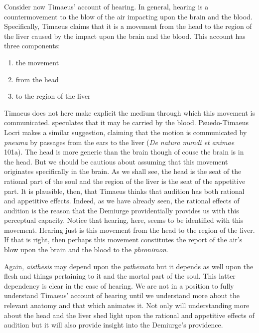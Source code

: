 Consider now Timaeus' account of hearing. In general, hearing is a countermovement to the blow of the air impacting upon the brain and the blood. Specifically, Timaeus claims that it is a movement from the head to the region of the liver caused by the impact upon the brain and the blood. This account has three components:
\begin{enumerate}
	\item the movement
	\item from the head
	\item to the region of the liver
\end{enumerate}
Timaeus does not here make explicit the medium through which this movement is communicated. \citealt[477]{Taylor:1928qb} speculates that it may be carried by the blood. Psuedo-Timaeus Locri makes a similar suggestion, claiming that the motion is communicated by \emph{pneuma} by passages from the ears to the liver (\emph{De natura mundi et animae} 101a). The head is more generic than the brain though of couse the brain is in the head. But we should be cautious about assuming that this movement originates specifically in the brain. As we shall see, the head is the seat of the rational part of the soul and the region of the liver is the seat of the appetitive part. It is plausible, then, that Timaeus thinks that audition has both rational and appetitive effects. Indeed, as we have already seen, the rational effects of audition is the reason that the Demiurge providentially provides us with this perceptual capacity. Notice that hearing, here, seems to be identified with this movement. Hearing just is this movement from the head to the region of the liver. If that is right, then perhaps this movement constitutes the report of the air's blow upon the brain and the blood to the \emph{phronimon}.

Again, \emph{aisthēsis} may depend upon the \emph{pathēmata} but it depends as well upon the flesh and things pertaining to it and the mortal part of the soul. This latter dependency is clear in the case of hearing. We are not in a position to fully understand Timaeus' account of hearing until we understand more about the relevant anatomy and that which animates it. Not only will understanding more about the head and the liver shed light upon the rational and appetitive effects of audition but it will also provide insight into the Demiurge's providence.

